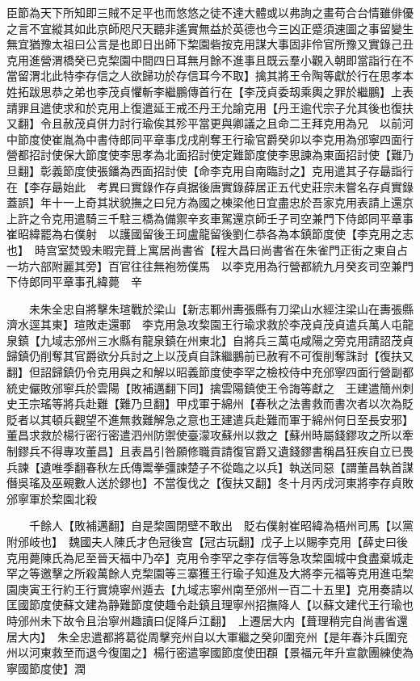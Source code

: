 臣節為天下所知即三賊不足平也而悠悠之徒不達大體或以弗詢之畫苟合台情雖俳優之言不宜縱其如此京師咫尺天聽非遙實無益於英德也今三凶正蹙須速圖之事留變生無宜猶豫太祖曰公言是也即日出師下棃園砦按克用謀大事固非伶官所豫又實錄己丑克用進營渭橋癸已克棃園中間四日耳無月餘不進事且既云羣小觀入朝即當詣行在不當留渭北此特李存信之人欲歸功於存信耳今不取】擒其將王令陶等獻於行在思孝本姓拓跋思恭之弟也李茂貞懼斬李繼鵬傳首行在【李茂貞委刼乘輿之罪於繼鵬】上表請罪且遣使求和於克用上復遣延王戒丕丹王允諭克用【丹王逾代宗子允其後也復扶又翻】令且赦茂貞併力討行瑜俟其殄平當更與卿議之且命二王拜克用為兄　以前河中節度使崔胤為中書侍郎同平章事戊戌削奪王行瑜官爵癸卯以李克用為邠寧四面行營都招討使保大節度使李思孝為北面招討使定難節度使李思諫為東面招討使【難乃旦翻】彰義節度使張鐇為西面招討使【命李克用自南臨討之】克用遣其子存朂詣行在【李存朂始此　考異曰實錄作存貞据後唐實錄薛居正五代史莊宗未嘗名存貞實錄蓋誤】年十一上奇其狀貌撫之曰兒方為國之棟梁他日宜盡忠於吾家克用表請上還京上許之令克用遣騎三千駐三橋為備禦辛亥車駕還京師壬子司空兼門下侍郎同平章事崔昭緯罷為右僕射　以護國留後王珂盧龍留後劉仁恭各為本鎮節度使【李克用之志也】　時宫室焚毁未暇完葺上寓居尚書省【程大昌曰尚書省在朱雀門正街之東自占一坊六部附麗其旁】百官往往無袍笏僕馬　以李克用為行營都統九月癸亥司空兼門下侍郎同平章事孔緯薨　辛

　　未朱全忠自將擊朱瑄戰於梁山【新志鄆州夀張縣有刀梁山水經注梁山在夀張縣濟水逕其東】瑄敗走還鄆　李克用急攻棃園王行瑜求救於李茂貞茂貞遣兵萬人屯龍泉鎮【九域志邠州三水縣有龍泉鎮在州東北】自將兵三萬屯咸陽之旁克用請詔茂貞歸鎮仍削奪其官爵欲分兵討之上以茂貞自誅繼鵬前已赦宥不可復削奪誅討【復扶又翻】但詔歸鎮仍令克用與之和解以昭義節度使李罕之檢校侍中充邠寧四面行營副都統史儼敗邠寧兵於雲陽【敗補邁翻下同】擒雲陽鎮使王令誨等獻之　王建遣簡州刺史王宗瑤等將兵赴難【難乃旦翻】甲戍軍于綿州【春秋之法書救而書次者以次為貶貶者以其頓兵觀望不進無救難解急之意也王建遣兵赴難而軍于綿州何日至長安邪】　董昌求救於楊行密行密遣泗州防禦使臺濛攻蘇州以救之【蘇州時屬錢鏐攻之所以牽制鏐兵不得專攻董昌】且表昌引咎願修職貢請復官爵又遺錢鏐書稱昌狂疾自立已畏兵諫【遺唯季翻春秋左氏傳鬻拳彊諫楚子不從臨之以兵】執送同惡【謂董昌執首謀僭吳瑤及巫覡數人送於鏐也】不當復伐之【復扶又翻】冬十月丙戌河東將李存貞敗邠寧軍於棃園北殺

　　千餘人【敗補邁翻】自是棃園閉壁不敢出　貶右僕射崔昭緯為梧州司馬【以黨附邠岐也】　魏國夫人陳氏才色冠後宫【冠古玩翻】戊子上以賜李克用【薛史曰後克用薨陳氏為尼至晉天福中乃卒】克用令李罕之李存信等急攻棃園城中食盡棄城走罕之等邀擊之所殺萬餘人克棃園等三寨獲王行瑜子知進及大將李元福等克用進屯棃園庚寅王行約王行實燒寧州遁去【九域志寧州南至邠州一百二十五里】克用奏請以匡國節度使蘇文建為静難節度使趣令赴鎮且理寧州招撫降人【以蘇文建代王行瑜也時邠州未下故令且治寧州趣讀曰促降戶江翻】　上遷居大内【葺理稍完自尚書省還居大内】　朱全忠遣都將葛從周擊兖州自以大軍繼之癸卯圍兖州【是年春汴兵圍兖州以河東救至而退今復圍之】楊行密遣寧國節度使田頵【景福元年升宣歙團練使為寧國節度使】潤

